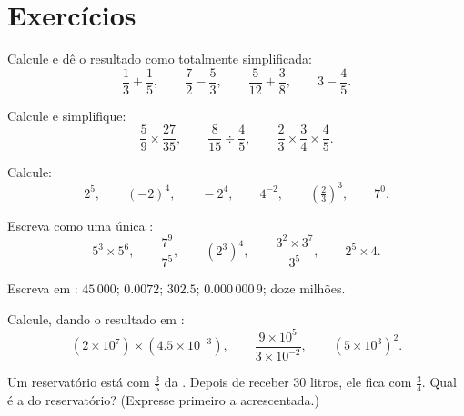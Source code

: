 \section{Exercícios}

\begin{exercise}[$\star$]\label{exo:g9:fractions:1}
Calcule e dê o resultado como  totalmente simplificada:
\[
\frac13 + \frac15, \qquad
\frac72 - \frac53, \qquad
\frac{5}{12} + \frac38, \qquad
3 - \frac45 .
\]
\end{exercise}

\begin{exercise}[$\star$]\label{exo:g9:fractions:2}
Calcule e simplifique:
\[
\frac59 \times \frac{27}{35}, \qquad
\frac{8}{15} \div \frac{4}{5}, \qquad
\frac23 \times \frac34 \times \frac45 .
\]
\end{exercise}

\begin{exercise}[$\star$]\label{exo:g9:fractions:3}
Calcule:
\[
2^5, \qquad (-2)^4, \qquad -2^4, \qquad 4^{-2}, \qquad
\left(\tfrac23\right)^3, \qquad 7^0 .
\]
\end{exercise}

\begin{exercise}[$\star$]\label{exo:g9:fractions:4}
Escreva como uma única :
\[
5^3 \times 5^6, \qquad
\frac{7^9}{7^5}, \qquad
\left(2^3\right)^4, \qquad
\frac{3^2 \times 3^7}{3^5}, \qquad
2^5 \times 4 .
\]
\end{exercise}

\begin{exercise}[$\star$]\label{exo:g9:fractions:5}
Escreva em : $45\,000$; $0.0072$; $302.5$;
$0.000\,000\,9$; doze milhões.
\end{exercise}

\begin{exercise}[$\star\star$]\label{exo:g9:fractions:6}
Calcule, dando o resultado em :
\[
(2 \times 10^7) \times (4.5 \times 10^{-3}),
\qquad
\frac{9 \times 10^5}{3 \times 10^{-2}},
\qquad
(5 \times 10^3)^2 .
\]
\end{exercise}

\begin{exercise}[$\star\star$]\label{exo:g9:fractions:7}
Um reservatório está com $\frac35$ da . Depois de receber
$30$ litros, ele fica com $\frac34$. Qual é a  do
reservatório? (Expresse primeiro a  acrescentada.)
\end{exercise}

